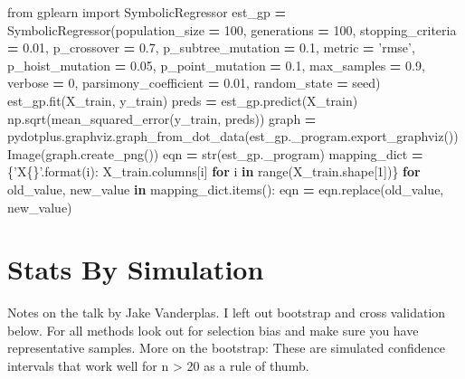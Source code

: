 \documentclass[]{book}
\newenvironment{Shaded}{\begin{snugshade}}{\end{snugshade}}
\newcommand{\BuiltInTok}[1]{#1}
\newcommand{\ControlFlowTok}[1]{\textcolor[rgb]{0.13,0.29,0.53}{\textbf{#1}}}
\newcommand{\DecValTok}[1]{\textcolor[rgb]{0.00,0.00,0.81}{#1}}
\newcommand{\FloatTok}[1]{\textcolor[rgb]{0.00,0.00,0.81}{#1}}
\newcommand{\ImportTok}[1]{#1}
\newcommand{\KeywordTok}[1]{\textcolor[rgb]{0.13,0.29,0.53}{\textbf{#1}}}
\newcommand{\NormalTok}[1]{#1}
\newcommand{\OperatorTok}[1]{\textcolor[rgb]{0.81,0.36,0.00}{\textbf{#1}}}
\newcommand{\SpecialCharTok}[1]{\textcolor[rgb]{0.00,0.00,0.00}{#1}}
\newcommand{\StringTok}[1]{\textcolor[rgb]{0.31,0.60,0.02}{#1}}
\begin{document}
\begin{Shaded}
\begin{Highlighting}[]
\ImportTok{from}\NormalTok{ gplearn }\ImportTok{import}\NormalTok{ SymbolicRegressor}
\NormalTok{est_gp }\OperatorTok{=}\NormalTok{ SymbolicRegressor(population_size }\OperatorTok{=} \DecValTok{100}\NormalTok{, generations }\OperatorTok{=} \DecValTok{100}\NormalTok{, stopping_criteria }\OperatorTok{=} \FloatTok{0.01}\NormalTok{, p_crossover }\OperatorTok{=} \FloatTok{0.7}\NormalTok{, p_subtree_mutation }\OperatorTok{=} \FloatTok{0.1}\NormalTok{, metric }\OperatorTok{=} \StringTok{'rmse'}\NormalTok{, p_hoist_mutation }\OperatorTok{=} \FloatTok{0.05}\NormalTok{, p_point_mutation }\OperatorTok{=} \FloatTok{0.1}\NormalTok{, max_samples }\OperatorTok{=} \FloatTok{0.9}\NormalTok{, verbose }\OperatorTok{=} \DecValTok{0}\NormalTok{, parsimony_coefficient }\OperatorTok{=} \FloatTok{0.01}\NormalTok{, random_state }\OperatorTok{=}\NormalTok{ seed)}
\NormalTok{est_gp.fit(X_train, y_train)}
\NormalTok{preds }\OperatorTok{=}\NormalTok{ est_gp.predict(X_train)}
\NormalTok{np.sqrt(mean_squared_error(y_train, preds))}
\NormalTok{graph }\OperatorTok{=}\NormalTok{ pydotplus.graphviz.graph_from_dot_data(est_gp._program.export_graphviz())}
\NormalTok{Image(graph.create_png())}
\NormalTok{eqn }\OperatorTok{=} \BuiltInTok{str}\NormalTok{(est_gp._program)}
\NormalTok{mapping_dict }\OperatorTok{=}\NormalTok{ \{}\StringTok{'X}\SpecialCharTok{\{\}}\StringTok{'}\NormalTok{.}\BuiltInTok{format}\NormalTok{(i): X_train.columns[i] }\ControlFlowTok{for}\NormalTok{ i }\KeywordTok{in} \BuiltInTok{range}\NormalTok{(X_train.shape[}\DecValTok{1}\NormalTok{])\}}
\ControlFlowTok{for}\NormalTok{ old_value, new_value }\KeywordTok{in}\NormalTok{ mapping_dict.items():}
\NormalTok{  eqn }\OperatorTok{=}\NormalTok{ eqn.replace(old_value, new_value)}
\end{Highlighting}
\end{Shaded}

\hypertarget{stats-by-simulation}{%
\section{Stats By Simulation}\label{stats-by-simulation}}

Notes on the talk by Jake Vanderplas. I left out bootstrap and cross validation below. For all methods look out for selection bias and make sure you have representative samples. More on the bootstrap: These are simulated confidence intervals that work well for n \textgreater{} 20 as a rule of thumb.
\end{document}
